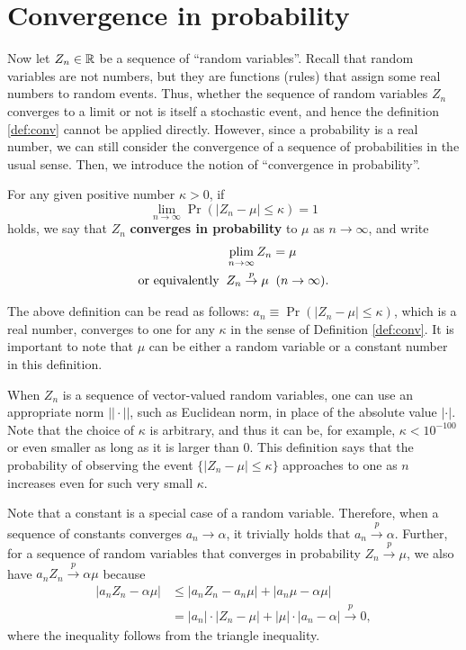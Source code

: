 \documentclass[11pt, A4paper, openany, uplatex]{book}
\begin{document}
\section{Convergence in probability}\label{subsec:inprob}

Now let $Z_n \in \mathbb{R}$ be a  sequence of ``random variables''.
Recall that random variables are not numbers, but they are functions (rules) that assign some real numbers to random events.
Thus, whether the sequence of random variables $Z_n$ converges to a limit or not is itself a stochastic event, and hence the definition \ref{def:conv} cannot be applied directly.
However, since a probability is a real number, we can still consider the convergence of a sequence of probabilities in the usual sense.
Then, we introduce the notion of ``convergence in probability''.
\begin{definition}
For any given positive number $\kappa > 0$, if
\[
	\lim_{n \to \infty} \Pr(|Z_n - \mu| \le \kappa) = 1
\]
holds, we say that $Z_n$ \textbf{converges in probability} to $\mu$ as $n \to \infty$, and write 
\begin{align*}
	& \operatorname*{plim}_{n \to \infty} Z_n = \mu \\
	\text{or equivalently} \;\; &  Z_n \overset{p}{\to} \mu \;\; (n\to\infty).
\end{align*}
\end{definition}

The above definition can be read as follows: $a_n \equiv \Pr(|Z_n - \mu| \le \kappa)$, which is a real number, converges to one for any $\kappa$ in the sense of Definition \ref{def:conv}.
It is important to note that $\mu$ can be either a random variable or a constant number in this definition.

When $Z_n$ is a sequence of vector-valued random variables, one can use an appropriate norm $||\cdot||$, such as Euclidean norm, in place of the absolute value $|\cdot|$.
Note that the choice of $\kappa$ is arbitrary, and thus it can be, for example, $\kappa < 10^{-100}$ or even smaller as long as it is larger than 0.
This definition says that the probability of observing the event $\{|Z_n - \mu| \le \kappa\}$ approaches to one as $n$ increases even for such very small $\kappa$. 

Note that a constant is a special case of a random variable.
Therefore, when a sequence of constants converges $a_n \to \alpha$, it trivially holds that $a_n \overset{p}{\to} \alpha$.
Further, for a sequence of random variables that converges in probability $Z_n \overset{p}{\to} \mu$, we also have $a_n Z_n  \overset{p}{\to} \alpha \mu $ because
\begin{align*}
	|a_n Z_n - \alpha \mu| 
	& \le |a_n Z_n - a_n \mu| + |a_n \mu - \alpha \mu|\\
	& = |a_n| \cdot |Z_n - \mu| + |\mu| \cdot |a_n - \alpha| \overset{p}{\to} 0,
\end{align*}
where the inequality follows from the triangle inequality.
\end{document}

